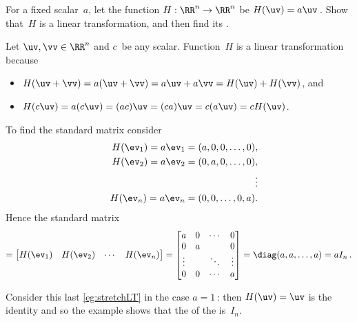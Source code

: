 \begin{example} \label{eg:stretchLT}
For a fixed scalar~\(a\), let the function \(H:\RR^n\to\RR^n\) be \(H(\uv)=a\uv\)\,.  Show that~\(H\) is a linear transformation, and then find its .
\begin{solution} 
Let \(\uv,\vv\in\RR^n\) and \(c\)~be any scalar.
Function~\(H\) is a linear transformation because
\begin{itemize}
\item \(H(\uv+\vv)=a(\uv+\vv)=a\uv+a\vv=H(\uv)+H(\vv)\), and
\item \(H(c\uv)=a(c\uv)=(ac)\uv=(ca)\uv=c(a\uv)=cH(\uv)\).
\end{itemize}
To find the standard matrix consider
\begin{eqnarray*}
&&H(\ev_1)=a\ev_1=(a,0,0,\ldots,0),
\\&&H(\ev_2)=a\ev_2=(0,a,0,\ldots,0),
\\&&\qquad\vdots
\\&&H(\ev_n)=a\ev_n=(0,0,\ldots,0,a).
\end{eqnarray*}
Hence the standard matrix 
\begin{equation*}
[H]=\begin{bmatrix} H(\ev_1)&H(\ev_2)&\cdots&H(\ev_n) \end{bmatrix}
=\begin{bmatrix} a&0&\cdots&0
\\0&a&&0
\\\vdots&&\ddots&\vdots
\\0&0&\cdots&a \end{bmatrix}
=\diag(a,a,\ldots,a)
=aI_n\,.
\end{equation*}

\end{solution}
\end{example}

Consider this last \cref{eg:stretchLT} in the case \(a=1\)\,: then \(H(\uv)=\uv\) is the identity and so the example shows that the  of the  is~\(I_n\).



